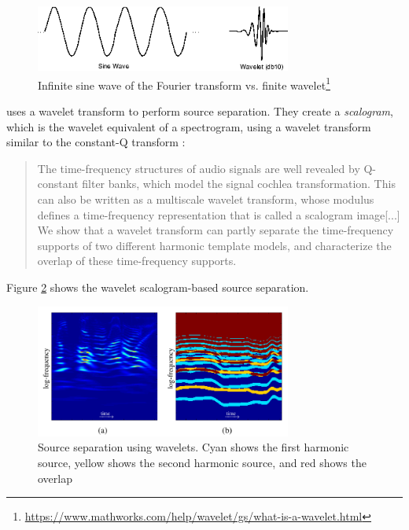 \documentclass[report.tex]{subfiles}
\begin{document}
\begin{figure}[ht]
	\centering
        \begin{minipage}{1.\textwidth}
		\renewcommand\footnoterule{} %
		\renewcommand{\thempfootnote}{\fnsymbol{mpfootnote}}
		\includegraphics[width=0.75\textwidth]{./images-wavelets/wavelet.png}
		\caption[Infinite sine wave of the Fourier transform vs. finite wavelet]{Infinite sine wave of the Fourier transform vs. finite wavelet\footnote[1]{\url{https://www.mathworks.com/help/wavelet/gs/what-is-a-wavelet.html}}}
		\label{fig:waveletinf}
	\end{minipage}
\end{figure}

\textcite{wavelets} uses a wavelet transform to perform source separation. They create a \textit{scalogram}, which is the wavelet equivalent of a spectrogram, using a wavelet transform similar to the constant-Q transform \parencite[2--3]{wavelets}:

\begin{quote}
	The time-frequency structures of audio signals are well revealed by Q-constant filter banks, which model the signal cochlea transformation. This can also be written as a multiscale wavelet transform, whose modulus defines a time-frequency representation that is called a scalogram image[...] We show that a wavelet transform can partly separate the time-frequency supports of two different harmonic template models, and characterize the overlap of these time-frequency supports.
\end{quote}

Figure \ref{fig:waveletsep} shows the wavelet scalogram-based source separation.

\begin{figure}[ht]
	\centering
	\includegraphics[width=0.75\textwidth]{./images-wavelets/wavelet_sep.png}
	\caption{Source separation using wavelets. Cyan shows the first harmonic source, yellow shows the second harmonic source, and red shows the overlap \parencite[5]{wavelets}}
	\label{fig:waveletsep}
\end{figure}
\end{document}

